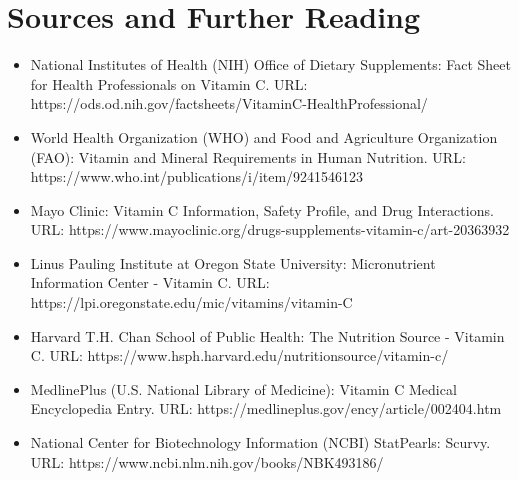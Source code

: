\section*{Sources and Further Reading}
\begin{itemize}
    \item National Institutes of Health (NIH) Office of Dietary Supplements: Fact Sheet for Health Professionals on Vitamin C. URL: https://ods.od.nih.gov/factsheets/VitaminC-HealthProfessional/
    \item World Health Organization (WHO) and Food and Agriculture Organization (FAO): Vitamin and Mineral Requirements in Human Nutrition. URL: https://www.who.int/publications/i/item/9241546123
    \item Mayo Clinic: Vitamin C Information, Safety Profile, and Drug Interactions. URL: https://www.mayoclinic.org/drugs-supplements-vitamin-c/art-20363932
    \item Linus Pauling Institute at Oregon State University: Micronutrient Information Center - Vitamin C. URL: https://lpi.oregonstate.edu/mic/vitamins/vitamin-C
    \item Harvard T.H. Chan School of Public Health: The Nutrition Source - Vitamin C. URL: https://www.hsph.harvard.edu/nutritionsource/vitamin-c/
    \item MedlinePlus (U.S. National Library of Medicine): Vitamin C Medical Encyclopedia Entry. URL: https://medlineplus.gov/ency/article/002404.htm
    \item National Center for Biotechnology Information (NCBI) StatPearls: Scurvy. URL: https://www.ncbi.nlm.nih.gov/books/NBK493186/
\end{itemize}